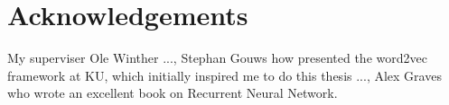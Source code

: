 \chapter{Acknowledgements}

My superviser Ole Winther ..., Stephan Gouws how presented the word2vec framework at KU, which initially inspired me to do this thesis ..., Alex Graves who wrote an excellent book on Recurrent Neural Network.
